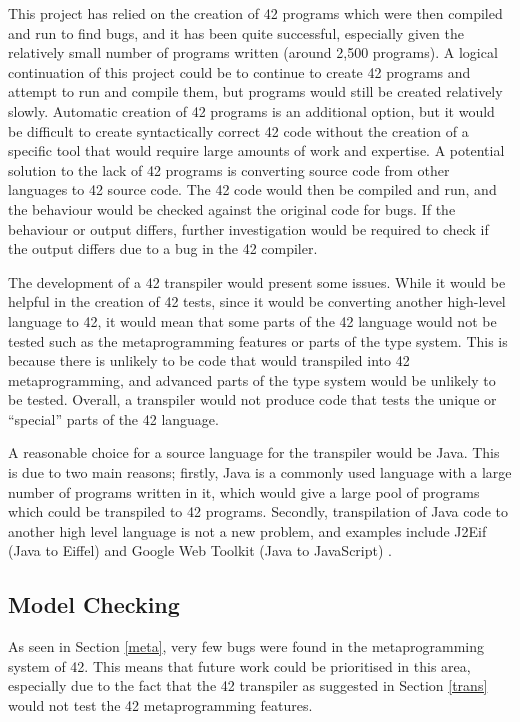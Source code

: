 This project has relied on the creation of 42 programs which were then compiled and run to find bugs, and it has been quite successful, especially given the relatively small number of programs written (around 2,500 programs). A logical continuation of this project could be to continue to create 42 programs and attempt to run and compile them, but programs would still be created relatively slowly. Automatic creation of 42 programs is an additional option, but it would be difficult to create syntactically correct 42 code without the creation of a specific tool that would require large amounts of work and expertise. A potential solution to the lack of 42 programs is converting source code from other languages to 42 source code. The 42 code would then be compiled and run, and the behaviour would be checked against the original code for bugs. If the behaviour or output differs, further investigation would be required to check if the output differs due to a bug in the 42 compiler. 

The development of a 42 transpiler would present some issues. While it would be helpful in the creation of 42 tests, since it would be converting another high-level language to 42, it would mean that some parts of the 42 language would not be tested such as the metaprogramming features or parts of the type system. This is because there is unlikely to be code that would transpiled into 42 metaprogramming, and advanced parts of the type system would be unlikely to be tested. Overall, a transpiler would not produce code that tests the unique or ``special'' parts of the 42 language. 

A reasonable choice for a source language for the transpiler would be Java. This is due to two main reasons; firstly, Java is a commonly used language with a large number of programs written in it, which would give a large pool of programs which could be transpiled to 42 programs. Secondly, transpilation of Java code to another high level language is not a new problem, and examples include J2Eif (Java to Eiffel) \cite{Java2ef} and Google Web Toolkit (Java to JavaScript) \cite{GWT}.


\subsection{Model Checking}

As seen in Section \ref{meta}, very few bugs were found in the metaprogramming system of 42. This means that future work could be prioritised in this area, especially due to the fact that the 42 transpiler as suggested in Section \ref{trans} would not test the 42 metaprogramming features. 

